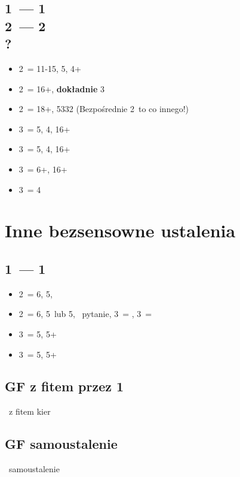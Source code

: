 \documentclass[12pt, a4paper]{article}
\begin{document}
\subsection*{1\hearts\ --- 1\spades \\ 2\clubs\ --- 2\diams \\ ?}
\begin{itemize}
    \item 2\hearts\ = 11-15, 5\hearts, 4+\clubs
    \item 2\spades\ = 16+, \textbf{dokładnie} 3\spades\ \imp
    \item 2\nt\ = 18+, 5332 (Bezpośrednie 2\nt\ to co innego!)
    \item 3\clubs\ = 5\hearts, 4\clubs, 16+
    \item 3\diams\ = 5\hearts, 4\diams, 16+
    \item 3\hearts\ = 6+\hearts, 16+
    \item 3\spades\ = 4\spades\ \gf
\end{itemize}


\pagebreak
\section*{Inne bezsensowne ustalenia}
\subsection*{1\hearts\ --- 1\ntx}
\begin{itemize}
    \item 2\spades\ = 6\hearts, 5\spades, \gf \imp
    \item 2\nt\ = 6\hearts, 5\clubs\ lub 5\diams, \gf
    \clubs\ pytanie, 3\diams\ = \clubs, 3\hearts\ = \diams
    \item 3\clubs\ = 5\hearts, 5+\clubs
    \item 3\diams\ = 5\hearts, 5+\diams
\end{itemize}

\subsection*{GF z fitem przez 1\spades}
\begin{center}
    \webidding{1\hearts & 1\spades \\ 2\clubs & 3\hearts\ }
    \gf\ z fitem kier
\end{center}

\subsection*{GF samoustalenie}
\begin{center}
    \webidding{1\hearts & 1\spades \\ 3\hearts} 
    \webidding{1\hearts & 1\nt \\ 3\hearts} 
    \webidding{1\spades & 1\nt \\ 3\spades} 
    \gf\ samoustalenie 
\end{center}
\end{document}
